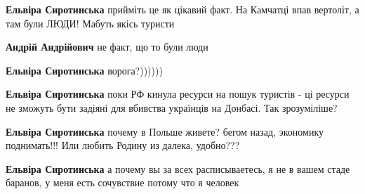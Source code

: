 \begin{itemize}
\begin{itemize}
\textbf{Ельвіра Сиротинська} прийміть це як цікавий факт. На Камчатці впав вертоліт, а там були ЛЮДИ! Мабуть якісь туристи \Smiley[1.0][yellow]

\begin{itemize}
 
\textbf{Андрій Андрійович} не факт, що то були люди
\end{itemize}

 
\textbf{Ельвіра Сиротинська} ворога?))))))

 
\textbf{Ельвіра Сиротинська} поки РФ кинула ресурси на пошук туристів - ці ресурси не зможуть бути задіяні для вбивства українців на Донбасі.
Так зрозуміліше?

 
\textbf{Ельвіра Сиротинська} почему в Польше живете? бегом назад, экономику поднимать!!! Или любить Родину из далека, удобно???

 
\textbf{Ельвіра Сиротинська} а почему вы за всех расписываетесь, я не в вашем стаде баранов, у меня есть сочувствие потому что я человек

\end{itemize}


\end{itemize}
